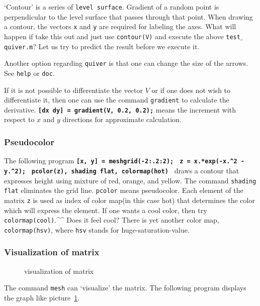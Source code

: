 `Contour' is a series of {\tt level surface}. Gradient of a random point is perpendicular to the level surface that passes through that point. When drawing a contour, the vectors {\tt x} and {\tt y} are required for labeling the axes. What will happen if take this out and just use {\tt contour(V)} and execute the above {\tt test\!$\_{}$quiver.m}? Let us try to predict the result before we execute it.

Another option regarding {\tt quiver} is that one can change the size of the arrows. See {\tt help} or {\tt doc}.

If it is not possible to differentiate the vector $V$ or if one does not wish to differentiate it, then one can use the command {\tt gradient} to calculate the derivative.
\matlabp\texttt{\textbf{[dx dy] = gradient(V, 0.2, 0.2);}}  means the increment with respect to $x$ and $y$ directions for approximate calculation.

\subsubsection{Pseudocolor}
The following program  \matlabp\texttt{\textbf{[x, y] = meshgrid(-2:.2:2); }} \matlabp\texttt{\textbf{z = x.*exp(-x.\^{}2 - y.\^{}2); }} \matlabp\texttt{\textbf{pcolor(z), shading flat, colormap(hot) }} \vn draws a contour that expresses height using mixture of red, orange, and yellow. The command {\tt shading flat} eliminates the grid line. {\tt pcolor} means pseudocolor. Each element of the matrix {\tt z} is used as index of color map(in this case hot) that determines the color which will express the element. If one wants a cool color, then try {\tt colormap(cool)}.\^{}\^{} Does it feel cool? There is yet another color map, {\tt colormap(hsv)}, where {\tt hsv} stands for huge-saturation-value.

\subsubsection{Visualization of matrix}

\begin{figure}[]
\center {} \caption{visualization of matrix} \label{mat}
\end{figure}

The command {\tt mesh} can `visualize' the matrix. The following program displays the graph like picture~\ref{mat}.

